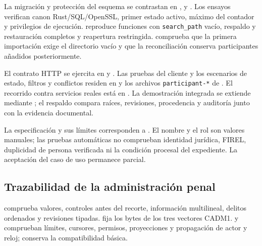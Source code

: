 {\raggedright La migración y protección del esquema se contrastan en ,  y . Los ensayos verifican canon Rust/SQL/OpenSSL, primer estado activo, máximo del contador y privilegios de ejecución.  reproduce funciones con \texttt{search\_path} vacío, respaldo y restauración completos y reapertura restringida.  comprueba que la primera importación exige el directorio vacío y que la reconciliación conserva participantes añadidos posteriormente.\par}

{\raggedright El contrato HTTP se ejercita en  y . Las pruebas del cliente y los escenarios de estado, filtros y conflictos residen en  y los archivos \texttt{participant-*} de . El recorrido contra servicios reales está en . La demostración integrada se extiende mediante ; el respaldo compara raíces, revisiones, procedencia y auditoría junto con la evidencia documental.\par}

{\raggedright La especificación y sus límites corresponden a . El nombre y el rol son valores manuales; las pruebas automáticas no comprueban identidad jurídica, FIREL, duplicidad de persona verificada ni la condición procesal del expediente. La aceptación del caso de uso permanece parcial.\par}

\subsection{Trazabilidad de la administración penal}\label{sec:matriz-administracion}

{\raggedright {} comprueba valores, controles antes del recorte, información multilineal, delitos ordenados y revisiones tipadas.  fija los bytes de los tres vectores CADM1.  y  comprueban límites, cursores, permisos, proyecciones y propagación de actor y reloj;  conserva la compatibilidad básica.\par}


